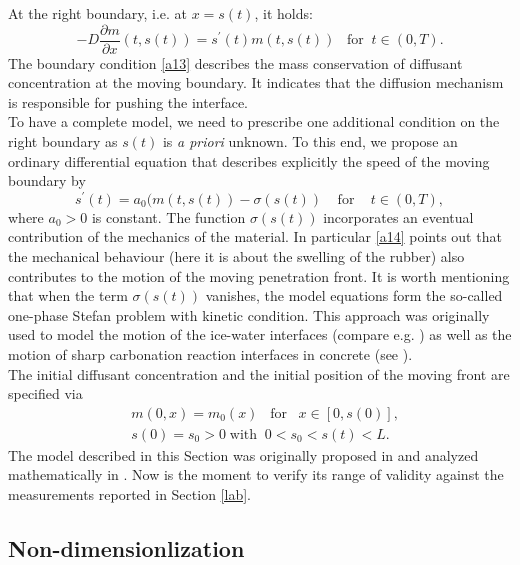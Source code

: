 \documentclass{article}
\begin{document}
At the right boundary, i.e. at $x = s(t)$, it holds: 
\begin{equation}
\label{a13}-D \frac{\partial m}{\partial x}(t, s(t))  =s^{\prime}(t)m(t, s(t))  \;\;\; \text{for}\;\; t\in(0, T).
\end{equation}
The boundary condition \eqref{a13} describes the mass conservation of diffusant concentration at the moving  boundary. It indicates that the diffusion mechanism is responsible for pushing the interface.\\
To have a complete model, we need to prescribe one additional condition on the right boundary as $s(t)$ is \textit{a priori} unknown. To this end, we propose an ordinary differential equation that describes explicitly the speed of the moving boundary by 
\begin{equation}
\label{a14}s^{\prime}(t) = a_0 (m(t, s(t)) - \sigma(s(t)) \;\;\;\;\text{for } \;\;\; t \in (0,T),
\end{equation}
where $a_0>0$ is constant. The  function $\sigma(s(t))$ incorporates an eventual contribution of the mechanics of the material. In particular \eqref{a14} points out that the mechanical behaviour (here it is about the swelling of the rubber) also contributes to the motion of the moving penetration front. It is worth mentioning that when the term $\sigma(s(t))$ vanishes, the model  equations  form the so-called one-phase  Stefan problem with  kinetic  condition. This approach was originally used to model the motion of the ice-water interfaces (compare e.g. \cite{alexiades1992mathematical}) as well as the motion of sharp carbonation reaction interfaces in concrete (see  \cite{aiki2011free,aiki2013large}).\\
The initial  diffusant concentration and the initial position of the moving front  are specified via
\begin{align}
\label{a15}&m(0, x) = m_0(x) \;\;\;\text{for}\;\;\; x \in [0, s(0)],\\
\label{a16} & s(0) = s_0>0\; \text{with}\;\; 0<  s_0< s(t) < L.
\end{align}
The model described in this Section was originally proposed in \cite{NHM} and analyzed mathematically in \cite{kumazaki2020global}. Now is the moment to verify its range of validity against the measurements reported in Section \ref{lab}.

\subsection{Non-dimensionlization}
\end{document}
